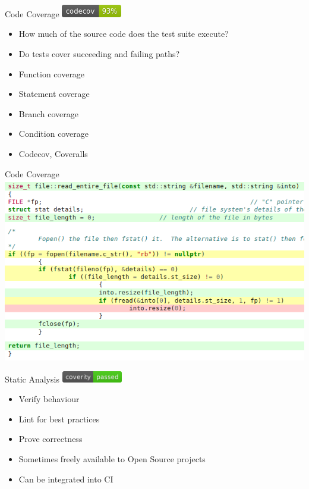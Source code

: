 \documentclass{beamer}
\begin{document}
\begin{frame}{Code Coverage}
	\includegraphics[width=100px]{codecov.png}
	\begin{itemize}
		\item How much of the source code does the test suite execute?
		\item Do tests cover succeeding and failing paths?
		\item Function coverage
		\item Statement coverage
		\item Branch coverage
		\item Condition coverage
		\item Codecov, Coveralls
	\end{itemize}
\end{frame}

\begin{frame}{Code Coverage}
	\includegraphics[width=\linewidth]{coverage.png}
\end{frame}

\begin{frame}{Static Analysis}
	\includegraphics[width=100px]{coverity.png}
	\begin{itemize}
		\item Verify behaviour
		\item Lint for best practices
		\item Prove correctness
		\item Sometimes freely available to Open Source projects
		\item Can be integrated into CI
	\end{itemize}
\end{frame}
\end{document}
